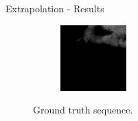 \documentclass{beamer}
\begin{document}
\begin{frame}{Extrapolation - Results}
\begin{figure}
\begin{subfigure}{.3\textwidth}
	    \end{subfigure}
	    \begin{subfigure}{.3\textwidth}
	        \centering
	        \includegraphics[width=\linewidth]{fig/extra/5.png}
	    \end{subfigure}
	    \caption{Ground truth sequence.}
	\end{figure}
\end{frame}
\end{document}

